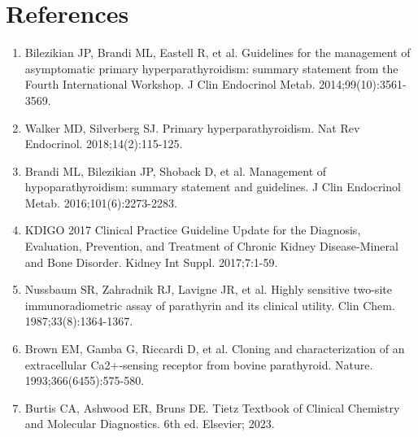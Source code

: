 \section*{References}
\begin{enumerate}
  \item Bilezikian JP, Brandi ML, Eastell R, et al. Guidelines for the management of asymptomatic primary hyperparathyroidism: summary statement from the Fourth International Workshop. J Clin Endocrinol Metab. 2014;99(10):3561-3569.
  \item Walker MD, Silverberg SJ. Primary hyperparathyroidism. Nat Rev Endocrinol. 2018;14(2):115-125.
  \item Brandi ML, Bilezikian JP, Shoback D, et al. Management of hypoparathyroidism: summary statement and guidelines. J Clin Endocrinol Metab. 2016;101(6):2273-2283.
  \item KDIGO 2017 Clinical Practice Guideline Update for the Diagnosis, Evaluation, Prevention, and Treatment of Chronic Kidney Disease-Mineral and Bone Disorder. Kidney Int Suppl. 2017;7:1-59.
  \item Nussbaum SR, Zahradnik RJ, Lavigne JR, et al. Highly sensitive two-site immunoradiometric assay of parathyrin and its clinical utility. Clin Chem. 1987;33(8):1364-1367.
  \item Brown EM, Gamba G, Riccardi D, et al. Cloning and characterization of an extracellular Ca2+-sensing receptor from bovine parathyroid. Nature. 1993;366(6455):575-580.
  \item Burtis CA, Ashwood ER, Bruns DE. Tietz Textbook of Clinical Chemistry and Molecular Diagnostics. 6th ed. Elsevier; 2023.
\end{enumerate}

\clearpage
